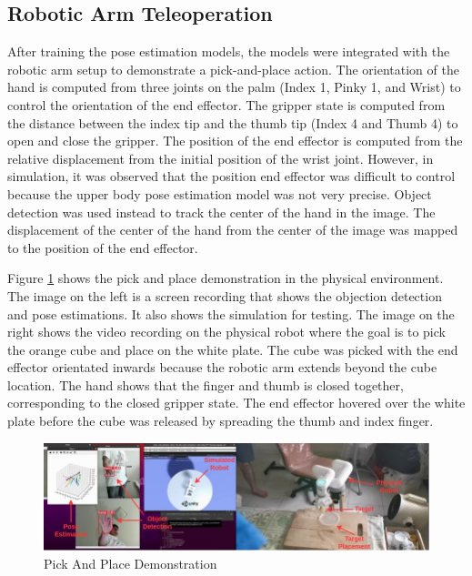 \newpage
\subsection{Robotic Arm Teleoperation}
\noindent
After training the pose estimation models, the models were integrated with the robotic arm setup to demonstrate a pick-and-place action. The orientation of the hand is computed from three joints on the palm (Index 1, Pinky 1, and Wrist) to control the orientation of the end effector. The gripper state is computed from the distance between the index tip and the thumb tip (Index 4 and Thumb 4) to open and close the gripper. The position of the end effector is computed from the relative displacement from the initial position of the wrist joint. However, in simulation, it was observed that the position end effector was difficult to control because the upper body pose estimation model was not very precise. Object detection was used instead to track the center of the hand in the image. The displacement of the center of the hand from the center of the image was mapped to the position of the end effector.

\noindent
Figure \ref{fig:pick_and_place_demo} shows the pick and place demonstration in the physical environment. The image on the left is a screen recording that shows the objection detection and pose estimations. It also shows the simulation for testing. The image on the right shows the video recording on the physical robot where the goal is to pick the orange cube and place on the white plate. The cube was picked with the end effector orientated inwards because the robotic arm extends beyond the cube location. The hand shows that the finger and thumb is closed together, corresponding to the closed gripper state. The end effector hovered over the white plate before the cube was released by spreading the thumb and index finger.
\begin{figure}[ht]
	\begin{center}
		\includegraphics[width=450px]{assets/pick_and_place.jpg}
		\caption{Pick And Place Demonstration}
		\label{fig:pick_and_place_demo}
	\end{center}
\end{figure}
